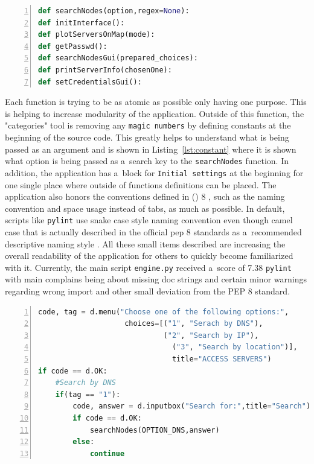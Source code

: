 {{{\noindent\begin{minipage}{\linewidth}
\begin{lstlisting}[language=Python, numbers=left, label={lst:descriptive}, caption=Example of Function Names, frame=single, showstringspaces=false, breaklines=true, keywordstyle=\color{blue},captionpos=b]
def searchNodes(option,regex=None):
def initInterface():
def plotServersOnMap(mode):
def getPasswd():
def searchNodesGui(prepared_choices):
def printServerInfo(chosenOne):
def setCredentialsGui():
\end{lstlisting}
\end{minipage}

Each function is trying to be as atomic as possible only having one purpose. This is helping to increase modularity of the application. Outside of this function, the "categories" tool is removing any \texttt{magic numbers} by defining constants at the beginning of the source code. This greatly helps to understand what is being passed as an argument and is shown in Listing~\ref{lst:constant} where it is shown what option is being passed as a~search key to the \texttt{searchNodes} function. In addition, the application has a~block for \texttt{Initial settings} at the beginning for one single place where outside of functions definitions can be placed. The application also honors the conventions defined in  () 8 \cite{pythonpep}, such as the naming convention and space usage instead of tabs, as much as possible. In default, scripts like \texttt{pylint} use snake case style naming convention even though camel case that is actually described in the official pep 8 standards as a~recommended descriptive naming style \cite{pythonpep}. All these small items described are increasing the overall readability of the application for others to quickly become familiarized with it. Currently, the main script \texttt{engine.py} received a~score of 7.38 \texttt{pylint} with main complains being about missing doc strings and certain minor warnings regarding wrong import and other small deviation from the PEP 8 standard.

{\noindent\begin{minipage}{\linewidth}
\begin{lstlisting}[language=Python, numbers=left, label={lst:constant}, caption=Example of Constant Usage, frame=single, showstringspaces=false, breaklines=true, keywordstyle=\color{blue},captionpos=b]
code, tag = d.menu("Choose one of the following options:",
					choices=[("1", "Serach by DNS"),
				      		 ("2", "Search by IP"),
					    	   ("3", "Search by location")],
						       title="ACCESS SERVERS")
if code == d.OK:
	#Search by DNS
	if(tag == "1"):
		code, answer = d.inputbox("Search for:",title="Search")
		if code == d.OK:
			searchNodes(OPTION_DNS,answer)
		else:
			continue
\end{lstlisting}
\end{minipage}

}}}}
